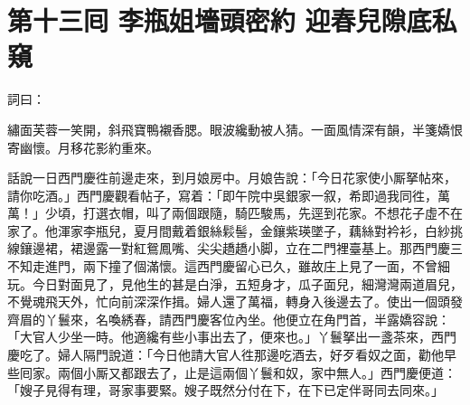 
\chapter*{第十三囘 李瓶姐墻頭密約 迎春兒隙底私窺}


詞曰：

\begin{myquote}
繡面芙蓉一笑開，斜飛寶鴨襯香腮。眼波纔動被人猜。一面風情深有韻，半箋嬌恨寄幽懷。月移花影約重來。

\end{myquote}

話說一日西門慶徃前邊走來，到月娘房中。月娘告說：「今日花家使小厮拏帖來，請你吃酒。」西門慶觀看帖子，寫着：「即午院中吳銀家一叙，希即過我同徃，萬萬！」少頃，打選衣帽，叫了兩個跟隨，騎匹駿馬，先逕到花家。不想花子虛不在家了。他渾家李瓶兒，夏月間戴着銀絲鬏髻，金鑲紫瑛墜子，藕絲對衿衫，白紗挑線鑲邊裙，裙邊露一對紅鴛鳳嘴、尖尖趫趫小脚，立在二門裡臺基上。那西門慶三不知走進門，兩下撞了個滿懷。{}這西門慶留心已久，雖故庄上見了一面，不曾細玩。今日對面見了，見他生的甚是白淨，五短身才，瓜子面兒，細灣灣兩道眉兒，不覺魂飛天外，忙向前深深作揖。婦人還了萬福，轉身入後邊去了。使出一個頭發齊眉的丫鬟來，名喚綉春，請西門慶客位內坐。他便立在角門首，半露嬌容說：「大官人少坐一時。他適纔有些小事出去了，便來也。」丫鬟拏出一盞茶來，西門慶吃了。婦人隔門說道：「今日他請大官人徃那邊吃酒去，好歹看奴之面，{}勸他早些囘家。兩個小厮又都跟去了，止是這兩個丫鬟和奴，家中無人。」{}西門慶便道：「嫂子見得有理，哥家事要緊。嫂子既然分付在下，在下已定伴哥同去同來。」

